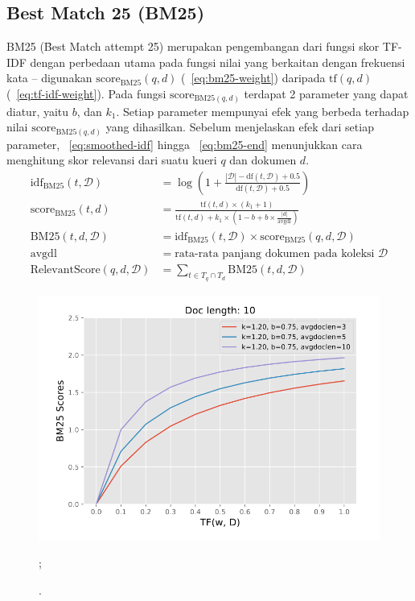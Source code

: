     \subsection{\f{Best Match 25} (BM25)}
    \label{sec:bm25}

    BM25 (\f{Best Match attempt} 25)  merupakan pengembangan dari fungsi skor TF-IDF dengan perbedaan utama pada fungsi nilai yang berkaitan dengan frekuensi kata -- digunakan $\text{score}_{\text{BM25}}(q,d)$ (\equ~\ref{eq:bm25-weight}) daripada $\text{tf}(q,d)$ (\equ~\ref{eq:tf-idf-weight}). Pada fungsi $\text{score}_{\text{BM25}(q,d)}$ terdapat 2 parameter yang dapat diatur, yaitu $b$, dan $k_1$. Setiap parameter mempunyai efek yang berbeda terhadap nilai $\text{score}_{\text{BM25}(q,d)}$ yang dihasilkan. Sebelum menjelaskan efek dari setiap parameter, \equ~\ref{eq:smoothed-idf} hingga \equ~\ref{eq:bm25-end} menunjukkan cara menghitung skor relevansi dari suatu kueri $q$ dan dokumen $d$. 
    \begin{align}
        \label{eq:smoothed-idf}
        \text{idf}_{\text{BM25}}(t, \mathcal{D}) &= \log\left(1+\frac{|\mathcal{D}| - \text{df}(t, \mathcal{D}) + 0.5}{\text{df}(t, \mathcal{D}) + 0.5}\right) \\
        \label{eq:bm25scoring}
        \text{score}_{\text{BM25}}(t,d) &= \frac{\text{tf}(t, d) \times (k_1 + 1)}{\text{tf}(t, d) + k_1 \times (1 - b + b \times \frac{|d|}{\text{avgdl}})} \\
        \label{eq:bm25-weight}
        \text{BM25}(t, d, \mathcal{D}) &= \text{idf}_{\text{BM25}}(t, \mathcal{D}) \times \text{score}_{\text{BM25}}(q,d,\mathcal{D}) \\
        \text{avgdl} &= \text{rata-rata panjang dokumen pada koleksi } \mathcal{D} \\
        \label{eq:bm25-end}
        \text{RelevantScore}(q,d,\mathcal{D}) &= \sum_{t \in T_q \cap T_d} \text{BM25}(t, d, \mathcal{D})
    \end{align}
    \begin{figure}
        \centering
        \includegraphics[width=1\textwidth]{assets/pics/effect-bm25-long-doc.png}
        \caption{\license.};
        \label{fig:effect-bm25-long-doc}
    \end{figure}


